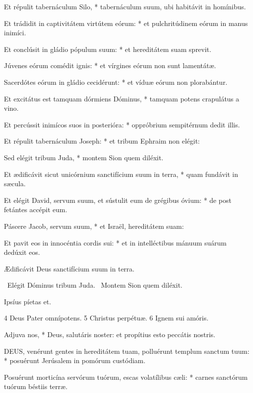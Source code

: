 Et répulit tabernáculum Silo, * tabernáculum suum, ubi habitávit in homínibus.

Et trádidit in captivitátem virtútem eórum: * et pulchritúdinem eórum in manus inimíci.

Et conclúsit in gládio pópulum suum: * et hereditátem suam sprevit.

Júvenes eórum comédit ignis: * et vírgines eórum non sunt lamentátæ.

Sacerdótes eórum in gládio cecidérunt: * et víduæ eórum non plorabántur.

Et excitátus est tamquam dórmiens Dóminus, * tamquam potens crapulátus a vino.

Et percússit inimícos suos in posterióra: * oppróbrium sempitérnum dedit illis.

Et répulit tabernáculum Joseph: * et tribum Ephraim non elégit:

Sed elégit tribum Juda, * montem Sion quem diléxit.

Et ædificávit sicut unicórnium sanctifícium suum in terra, * quam fundávit in sæcula.

Et elégit David, servum suum, et sústulit eum de grégibus óvium: * de post fetántes accépit eum.

Páscere Jacob, servum suum, * et Israël, hereditátem suam:

Et pavit eos in innocéntia cordis sui: * et in intelléctibus mánuum suárum dedúxit eos.

 Ædificávit Deus sanctifícium suum in terra.


\V\ Elégit Dóminus tribum Juda. \R\ Montem Sion quem diléxit.

 Ipsíus píetas et.

 4 Deus Pater omnípotens. 5 Christus perpétuæ. 6 Ignem sui amóris.


 Adjuva nos, * Deus, salutáris noster: et propítius esto peccátis nostris.


\lettrine[lines=2]{D}{EUS}, venérunt gentes in hereditátem tuam, polluérunt templum sanctum tuum: * posuérunt Jerúsalem in pomórum custódiam.

Posuérunt morticína servórum tuórum, escas volatílibus cæli: * carnes sanctórum tuórum béstiis terræ.


